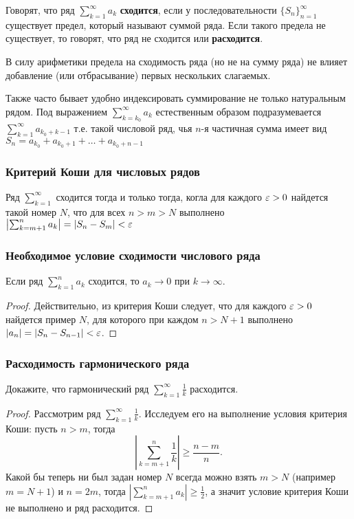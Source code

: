 \documentclass[12pt, a4paper]{article}
\begin{document}
    Говорят, что ряд $\sum_{k=1}^{\infty} a_k$ \textbf{сходится}, если у последовательности $\{S_n\}^{\infty}_{n=1}$ существует предел, который называют суммой ряда. Если такого предела не существует, то говорят, что ряд не сходится или \textbf{расходится}.

    В силу арифметики предела на сходимость ряда (но не на сумму ряда) не влияет добавление (или отбрасывание) первых нескольких слагаемых.

    Также часто бывает удобно индексировать суммирование не только натуральным рядом. Под выражением $\sum_{k=k_0}^{\infty} a_k$ естественным образом подразумевается $\sum_{k=1}^{\infty} a_{k_0 + k-1}$ т.е. такой числовой ряд, чья $n$-я частичная сумма имеет вид $S_n = a_{k_0} + a_{k_0 + 1} + \dots + a_{k_0 + n -1}$
    \subsubsection{Критерий Коши для числовых рядов}
    Ряд $\sum_{k=1}^{\infty}$ сходится тогда и только тогда, когла для каждого $\varepsilon > 0$ найдется такой номер $N$, что для всех $n > m > N$ выполнено $\left|\sum_{k = m + 1}^{n} a_k\right| = |S_n - S_m| < \varepsilon$
    \subsubsection{Необходимое условие сходимости числового ряда}
    Если ряд $\sum_{k=1}^{n} a_k$ сходится, то $a_k \to 0$ при $k \to \infty$.
    \begin{proof}
    Действительно, из критерия Коши следует, что для каждого $\varepsilon > 0$ найдется пример $N$, для которого при каждом $n > N + 1$ выполнено $|a_n| = |S_n - S_{n-1}| < \varepsilon$.
    \end{proof}
    \subsubsection{Расходимость гармонического ряда}
    Докажите, что гармонический ряд $\sum_{k=1}^{\infty} \frac{1}{k}$ расходится.
    \begin{proof}
    Рассмотрим ряд $\sum_{k=1}^{\infty} \frac{1}{k}$. Исследуем его на выполнение условия критерия Коши: пусть $n > m$, тогда 
    \begin{equation*}
        \left|\sum_{k=m+1}^{n} \frac{1}{k}\right| \geq \frac{n - m}{n}.
    \end{equation*}
    Какой бы теперь ни был задан номер $N$ всегда можно взять $m > N$ (например $m = N + 1$) и $n = 2m$, тогда $\left|\sum_{k=m+1}^{n} a_k\right| \geq \frac{1}{2}$, а значит условие критерия Коши не выполнено и ряд расходится.
    \end{proof}
\end{document}

